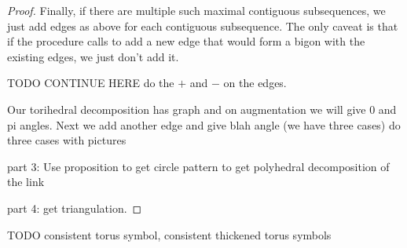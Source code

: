 \documentclass[11pt]{amsart}
\theoremstyle{plain}
\theoremstyle{definition}
\begin{document}
\begin{proof}
Finally, if there are multiple such maximal contiguous subsequences,
we just add edges as above for each contiguous subsequence.
The only caveat is that if the procedure calls to add a new edge
that would form a bigon with the existing edges,
we just don't add it.


TODO CONTINUE HERE do the $+$ and $-$ on the edges.




Our torihedral decomposition has graph and on augmentation we will give 0 and pi angles. Next we add another edge and give blah angle (we have three cases)
do three cases with pictures

part 3: Use proposition to get circle pattern to get polyhedral decomposition of the link 

part 4: get triangulation.  

\end{proof}





TODO consistent torus symbol, consistent thickened torus symbols
\end{document}
